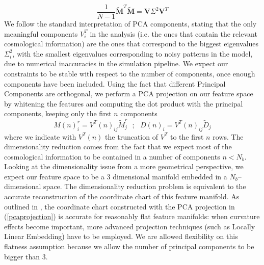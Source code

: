 \documentclass[reprint,aps,prd,superscriptaddress,showkeys,showpacs]{revtex4-1}
\begin{document}
\begin{equation}
\frac{1}{N-1}\mathbf{\tilde{M}}^T\mathbf{\tilde{M}} = \mathbf{V}\Sigma^2\mathbf{V}^T
\end{equation} 
%
We follow the standard interpretation of PCA components, stating that the only meaningful components $V^T_i$ in the analysis (i.e. the ones that contain the relevant cosmological information) are the ones that correspond to the biggest eigenvalues $\Sigma^2_{i}$, with the smallest eigenvalues corresponding to noisy patterns in the model, due to numerical inaccuracies in the simulation pipeline. We expect our constraints to be stable with respect to the number of components, once enough components have been included. Using the fact that different Principal Components are orthogonal, we perform a PCA projection on our feature space by whitening the features and computing the dot product with the principal components, keeping only the first $n$ components
\begin{equation}
\label{pcaprojection}
M(n)_{i}^r = V^T(n)_{ij}\tilde{M}_j^r \,\,\,\, ; \,\,\,\,  D(n)_i = V^T(n)_{ij}\tilde{D}_j
\end{equation}
%
where we indicate with $V^T(n)$ the truncation of $V^T$ to the first $n$ rows. The dimensionality reduction comes from the fact that we expect most of the cosmological information to be contained in a number of components $n<N_{b}$. Looking at the dimensionality issue from a more geometrical perspective, we expect our feature space to be a 3 dimensional manifold embedded in a $N_b$--dimensional space. The dimensionality reduction problem is equivalent to the accurate reconstruction of the coordinate chart of this feature manifold. As outlined in \citep{astroMLText}, the coordinate chart constructed with the PCA projection in (\ref{pcaprojection}) is accurate for reasonably flat feature manifolds: when curvature effects become important, more advanced projection techniques (such as Locally Linear Embedding) have to be employed. We are allowed flexibility on this flatness assumption because we allow the number of principal components to be bigger than 3. 


\end{document}
